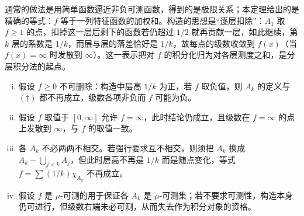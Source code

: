 \documentclass[../../main.tex]{subfiles}
\begin{document}
\begin{remark}\label{remark:ch01-thm-1-12-动机}
通常的做法是用简单函数逼近非负可测函数，得到的是极限关系；本定理给出的是精确的等式：$f$ 等于一列特征函数的加权和。构造的思想是“逐层扣除”：$A_{1}$ 取 $f\geqslant1$ 的点，扣掉这一层后剩下的函数若仍超过 $1/2$ 就再贡献一层，如此继续，第 $k$ 层的系数是 $1/k$，而层与层的落差恰好是 $1/k$，故每点的级数收敛到 $f(x)$（当 $f(x)=\infty$ 时发散到 $\infty$）。这一表示把对 $f$ 的积分化归为对各层测度之和，是分层积分法的起点。
\end{remark}

\begin{remark}\label{remark:ch01-thm-1-12-条件}
\begin{enumerate}[(i)]
\item 假设 $f\geqslant0$ 不可删除：构造中层高 $1/k$ 为正，若 $f$ 取负值，则 $A_{k}$ 的定义与 $(\dagger)$ 都不再成立，级数各项非负而 $f$ 可能为负。
\item 假设 $f$ 取值于 $[0,\infty]$ 允许 $f=\infty$，此时结论仍成立，且级数在 $f=\infty$ 的点上发散到 $\infty$，与 $f$ 的取值一致。
\item 各 $A_{k}$ 不必两两不相交。若强行要求互不相交，则须把 $A_{k}$ 换成 $A_{k}-\bigcup_{j<k}A_{j}$，但此时层高不再是 $1/k$ 而是随点变化，等式 $f=\sum(1/k)\chi_{A_{k}}$ 不再成立。
\item 假设 $f$ 是 $\mu$-可测的用于保证各 $A_{k}$ 是 $\mu$-可测集；若不要求可测性，构造本身仍可进行，但级数右端未必可测，从而失去作为积分对象的资格。
\end{enumerate}
\end{remark}
\end{document}
